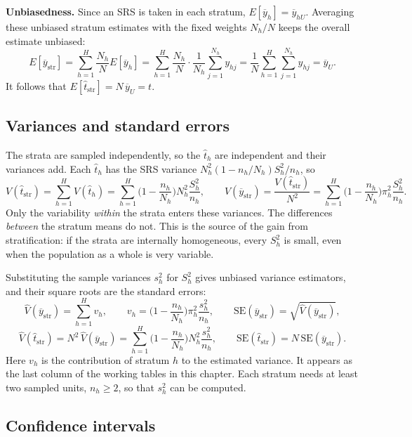 \documentclass[
  letterpaper,
  DIV=11,
  numbers=noendperiod]{scrreprt}
\renewcommand{\[}{\begin{equation}}
\renewcommand{\]}{\end{equation}}
\begin{document}
\textbf{Unbiasedness.} Since an SRS is taken in each stratum,
\(E[\overline y_h]=\overline y_{hU}\). Averaging these unbiased stratum
estimates with the fixed weights \(N_h/N\) keeps the overall estimate
unbiased: \[
E[\overline y_{\text{str}}]
 = \sum_{h=1}^H \frac{N_h}{N}E[\overline y_h]
 = \sum_{h=1}^H \frac{N_h}{N}\cdot \frac{1}{N_h}\sum_{j=1}^{N_h} y_{hj}
 = \frac1N\sum_{h=1}^H \sum_{j=1}^{N_h}y_{hj} = \overline y_U .
\] It follows that \(E[\hat t_{\text{str}}] = N\,\overline y_U = t\).

\subsection{Variances and standard
errors}\label{variances-and-standard-errors}

The strata are sampled independently, so the \(\hat t_h\) are
independent and their variances add. Each \(\hat t_h\) has the SRS
variance \(N_h^2(1-n_h/N_h)S_h^2/n_h\), so \[
V(\hat t_{\text{str}}) = \sum_{h=1}^H V(\hat t_h) = \sum_{h=1}^H \Big(1-\frac{n_h}{N_h}\Big)N_h^2\frac{S_h^2}{n_h},
\qquad
V(\overline y_{\text{str}}) = \frac{V(\hat t_{\text{str}})}{N^2} = \sum_{h=1}^H \Big(1-\frac{n_h}{N_h}\Big)\pi_h^2 \frac{S_h^2}{n_h}.
\] Only the variability \emph{within} the strata enters these variances.
The differences \emph{between} the stratum means do not. This is the
source of the gain from stratification: if the strata are internally
homogeneous, every \(S_h^2\) is small, even when the population as a
whole is very variable.

Substituting the sample variances \(s_h^2\) for \(S_h^2\) gives unbiased
variance estimators, and their square roots are the standard errors: \[
\boxed{
\hat V(\overline y_{\text{str}}) = \sum_{h=1}^H v_h, \qquad
v_h = \Big(1-\frac{n_h}{N_h}\Big)\pi_h^2\frac{s_h^2}{n_h}, \qquad
\mathrm{SE}(\overline y_{\text{str}}) = \sqrt{\hat V(\overline y_{\text{str}})} ,}
\] \[
\hat V(\hat t_{\text{str}}) = N^2\,\hat V(\overline y_{\text{str}}) = \sum_{h=1}^H \Big(1-\frac{n_h}{N_h}\Big)N_h^2\frac{s_h^2}{n_h},
\qquad
\mathrm{SE}(\hat t_{\text{str}}) = N\,\mathrm{SE}(\overline y_{\text{str}}).
\] Here \(v_h\) is the contribution of stratum \(h\) to the estimated
variance. It appears as the last column of the working tables in this
chapter. Each stratum needs at least two sampled units, \(n_h \ge 2\),
so that \(s_h^2\) can be computed.

\subsection{Confidence intervals}\label{confidence-intervals}
\end{document}

